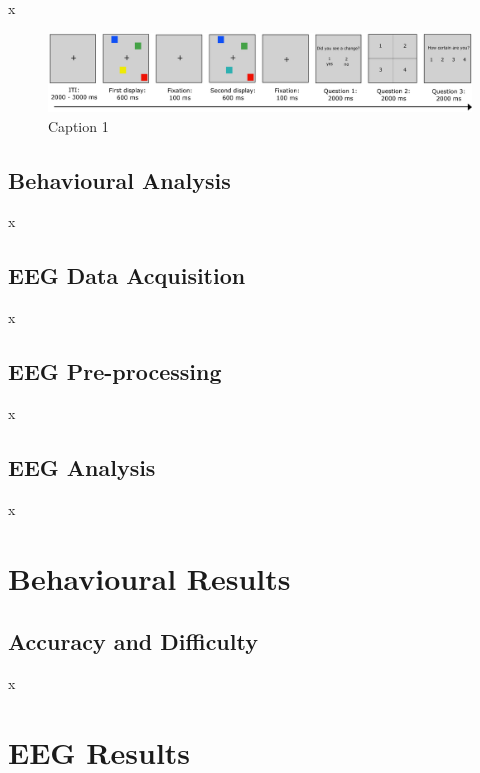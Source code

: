 x

\begin{figure}
	\includegraphics[width=1\textwidth]{paradigm_updated.eps}
	\caption{Caption 1}
	\label{fig:paradigm}       %
\end{figure}



\subsection{Behavioural Analysis}

x
\subsection{EEG Data Acquisition}

x

\subsection{EEG Pre-processing}

x



\subsection{EEG Analysis}

x


\section{Behavioural Results}
\label{behaviouralresults}
\subsection{Accuracy and Difficulty}

x

\section{EEG Results}
\label{EEGresults}


